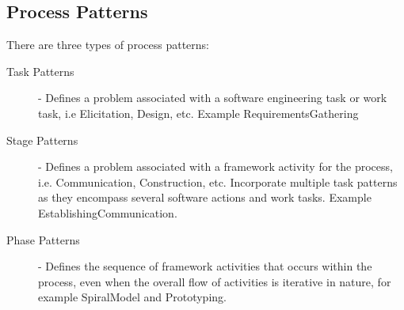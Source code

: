 \documentclass[12pt letter]{report}
\begin{document}
\subsection{Process Patterns}


There are three types of process patterns:
\begin{description}
  \item[Task Patterns] - Defines a problem associated with a software engineering task or work task, i.e Elicitation, Design, etc. Example RequirementsGathering
  \item[Stage Patterns]  - Defines a problem associated with a framework activity for the process, i.e. Communication, Construction, etc. Incorporate multiple task patterns as they encompass several software actions and work tasks. Example EstablishingCommunication.
  \item[Phase Patterns] - Defines the sequence of framework activities that occurs within the process, even when the overall flow of activities is iterative in nature, for example SpiralModel and Prototyping.
\end{description}
\end{document}
